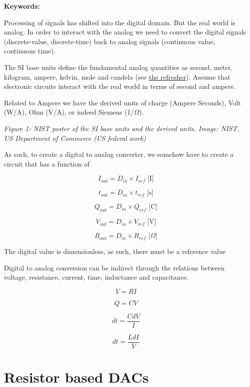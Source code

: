 \textbf{Keywords:}

Processing of signals has shifted into the digital domain. But the real
world is analog. In order to interact with the analog we need to convert
the digital signals (discrete-value, discrete-time) back to analog
signals (continuous value, continuous time).

The SI base units define the fundamental analog quantities as second,
meter, kilogram, ampere, kelvin, mole and candela (see
\href{/aic2026/a_refresher}{the refresher}). Assume that electronic
circuits interact with the real world in terms of second and ampere.

Related to Ampere we have the derived units of charge (Ampere Seconds),
Volt (W/A), Ohm (V/A), or indeed Siemens (1/\(\Omega\)).


{
\centering
{}
}

\emph{Figure 1: NIST poster of the SI base units and the derived units.
Image: NIST, US Department of Commerce (US federal work)}

As such, to create a digital to analog converter, we somehow have to
create a circuit that has a function of

\[ I_{out} = D_{in} \times I_{ref}\text{ [I]} \]

\[ t_{out} = D_{in} \times t_{ref}\text{ [s]} \]

\[ Q_{out} = D_{in} \times Q_{ref}\text{ [C]} \]

\[ V_{out} = D_{in} \times V_{ref}\text{ [V]} \]

\[ R_{out} = D_{in} \times R_{ref}\text{ [}\Omega\text{]} \]

The digital value is dimensionless, as such, there must be a reference
value

Digital to analog conversion can be indirect through the relations
between voltage, resistance, current, time, inductance and capacitance.

\[ V = R I \]

\[ Q = C V \]

\[ dt = \frac{C dV}{I} \]

\[ dt = \frac{L dI}{V} \]

\section{Resistor based DACs}\label{resistor-based-dacs}


{
\centering
{}
}

